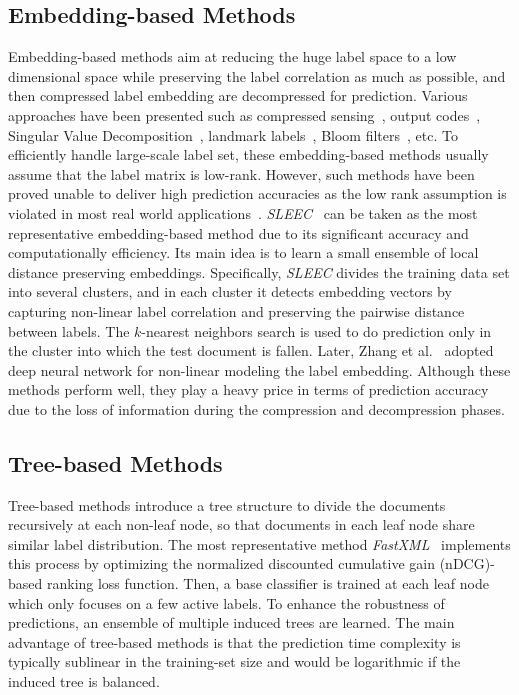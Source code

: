 \documentclass[runningheads]{llncs}
\begin{document}
\subsection{Embedding-based Methods}
Embedding-based methods aim at reducing the huge label space to a low dimensional space while preserving the label correlation as much as possible, and then compressed label embedding are decompressed for prediction. Various approaches have been presented such as compressed sensing~\cite{ref_article19}, output codes~\cite{ref_article20}, Singular Value Decomposition~\cite{ref_article21}, landmark labels~\cite{ref_article22}, Bloom filters~\cite{ref_article23}, etc. To efficiently handle large-scale label set, these embedding-based methods usually assume that the label matrix is low-rank. However, such methods have been proved unable to deliver high prediction accuracies as the low rank assumption is violated in most real world applications~\cite{ref_article9}. \textit{SLEEC}~\cite{ref_article9} can be taken as the most representative embedding-based method due to its significant accuracy and computationally efficiency. Its main idea is to learn a small ensemble of local distance preserving embeddings. Specifically, \textit{SLEEC} divides the training data set into several clusters, and in each cluster it detects embedding vectors by capturing non-linear label correlation and preserving the pairwise distance between labels. The $k$-nearest neighbors search is used to do prediction only in the cluster into which the test document is fallen. Later, Zhang et al.~\cite{ref_article15} adopted deep neural network for non-linear modeling the label embedding. Although these methods perform well, they play a heavy price in terms of prediction accuracy due to the loss of information during the compression and decompression phases.

\vspace{-2mm}
\subsection{Tree-based Methods}
Tree-based methods introduce a tree structure to divide the documents recursively at each non-leaf node, so that documents in each leaf node share similar label distribution. The most representative method \textit{FastXML}~\cite{ref_article18} implements this process by optimizing the normalized discounted cumulative gain (nDCG)-based ranking loss function.
Then, a base classifier is trained at each leaf node which only focuses on a few active labels. To enhance the robustness of predictions, an ensemble of multiple induced trees are learned. The main advantage of tree-based methods is that the prediction time complexity is typically sublinear in the training-set size and would be logarithmic if the induced tree is balanced. 
\end{document}
